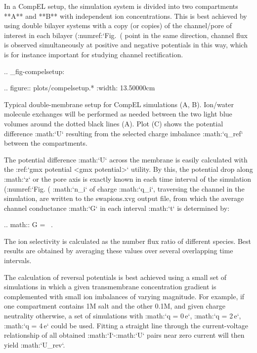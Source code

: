 In a CompEL setup, the simulation system is divided into two
compartments **A** and **B** with independent ion concentrations. This
is best achieved by using double bilayer systems with a copy (or copies)
of the channel/pore of interest in each bilayer
(:numref:`Fig. (%
point in the same direction, channel flux is observed simultaneously at
positive and negative potentials in this way, which is for instance
important for studying channel rectification.

.. _fig-compelsetup:

.. figure:: plots/compelsetup.*
   :width: 13.50000cm

   Typical double-membrane setup for CompEL simulations (A, B).
   Ion/water molecule exchanges will be performed as needed between the
   two light blue volumes around the dotted black lines (A). Plot (C)
   shows the potential difference :math:`\Delta U` resulting from the
   selected charge imbalance :math:`\Delta q_{ref}` between the
   compartments.

The potential difference :math:`\Delta U` across the membrane is easily
calculated with the :ref:`gmx potential <gmx potential>` utility. By this, the potential drop
along :math:`z` or the pore axis is exactly known in each time interval
of the simulation (:numref:`Fig. (%
:math:`n_i` of charge :math:`q_i`, traversing the channel in the
simulation, are written to the swapions.xvg output file, from which the
average channel conductance :math:`G` in each interval :math:`\Delta t`
is determined by:

.. math:: G =  \, .

The ion selectivity is calculated as the number flux ratio of different
species. Best results are obtained by averaging these values over
several overlapping time intervals.

The calculation of reversal potentials is best achieved using a small
set of simulations in which a given transmembrane concentration gradient
is complemented with small ion imbalances of varying magnitude. For
example, if one compartment contains 1M salt and the other 0.1M, and
given charge neutrality otherwise, a set of simulations with
:math:`\Delta q = 0\,e`, :math:`\Delta q = 2\,e`,
:math:`\Delta q = 4\,e` could be used. Fitting a straight line through
the current-voltage relationship of all obtained :math:`I`-:math:`U`
pairs near zero current will then yield :math:`U_{rev}`.

